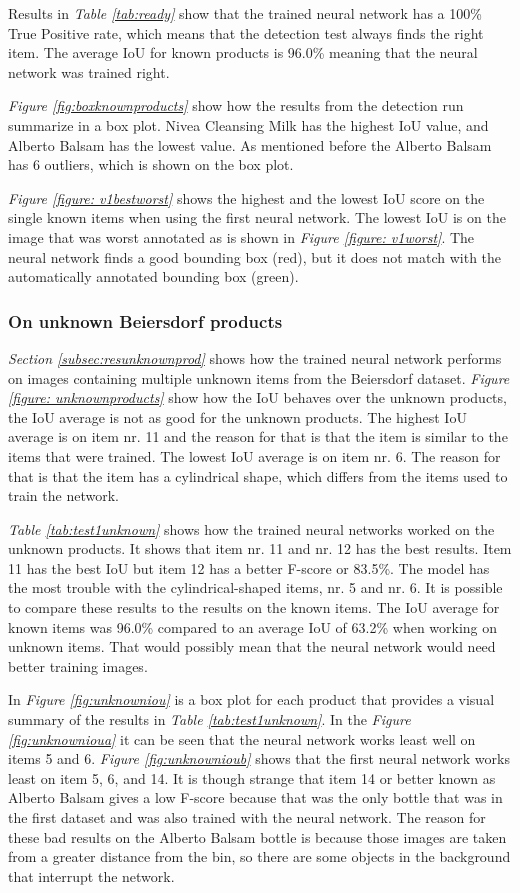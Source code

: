 Results in \textit{Table \ref{tab:ready}} show that the trained neural network has a 100\% True Positive rate, which means that the detection test always finds the right item. The average IoU for known products is 96.0\% meaning that the neural network was trained right.

\textit{Figure \ref{fig:boxknownproducts}} show how the results from the detection run summarize in a box plot. Nivea Cleansing Milk has the highest IoU value, and Alberto Balsam has the lowest value. As mentioned before the Alberto Balsam has 6 outliers, which is shown on the box plot.

\textit{Figure \ref{figure: v1bestworst}} shows the highest and the lowest IoU score on the single known items when using the first neural network. The lowest IoU is on the image that was worst annotated as is shown in \textit{Figure \ref{figure: v1worst}}. The neural network finds a good bounding box (red), but it does not match with the automatically annotated bounding box (green).

\subsubsection{On unknown Beiersdorf products}
\textit{Section \ref{subsec:resunknownprod}} shows how the trained neural network performs on images containing multiple unknown items from the Beiersdorf dataset. \textit{Figure \ref{figure: unknownproducts}} show how the IoU behaves over the unknown products, the IoU average is not as good for the unknown products. The highest IoU average is on item nr. 11 and the reason for that is that the item is similar to the items that were trained. The lowest IoU average is on item nr. 6. The reason for that is that the item has a cylindrical shape, which differs from the items used to train the network.

\textit{Table \ref{tab:test1unknown}} shows how the trained neural networks worked on the unknown products. It shows that item nr. 11 and nr. 12 has the best results. Item 11 has the best IoU but item 12 has a better F-score or 83.5\%. The model has the most trouble with the cylindrical-shaped items, nr. 5 and nr. 6. It is possible to compare these results to the results on the known items. The IoU average for known items was 96.0\% compared to an average IoU of 63.2\% when working on unknown items. That would possibly mean that the neural network would need better training images. 

In \textit{Figure \ref{fig:unknowniou}} is a box plot for each product that provides a visual summary of the results in \textit{Table \ref{tab:test1unknown}}. In the \textit{Figure \ref{fig:unknownioua}} it can be seen that the neural network works least well on items 5 and 6. \textit{Figure \ref{fig:unknownioub}} shows that the first neural network works least on item 5, 6, and 14. It is though strange that item 14 or better known as Alberto Balsam gives a low F-score because that was the only bottle that was in the first dataset and was also trained with the neural network. The reason for these bad results on the Alberto Balsam bottle is because those images are taken from a greater distance from the bin, so there are some objects in the background that interrupt the network. 

